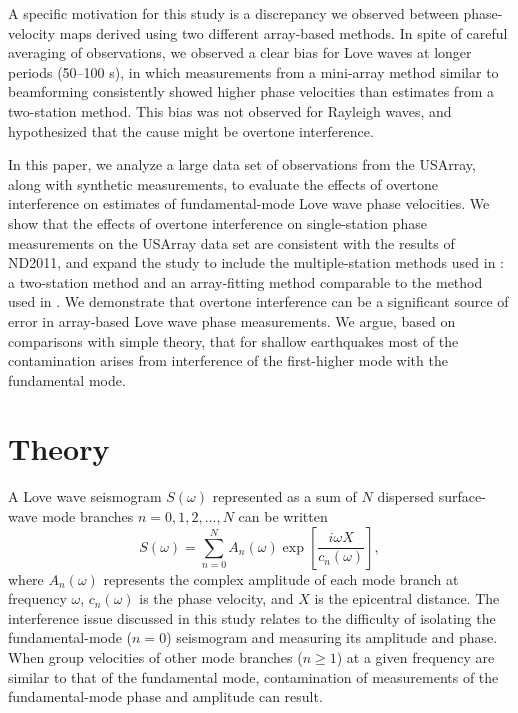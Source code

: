\documentclass[12pt,oneside]{book}
\begin{document}
A specific motivation for this study is a discrepancy we observed \citep{Fosteretal2014} between phase-velocity maps derived using two different array-based methods. In spite of careful averaging of observations, we observed a clear bias for Love waves at longer periods (50--100 s), in which measurements from a mini-array method similar to beamforming consistently showed higher phase velocities than estimates from a two-station method. This bias was not observed for Rayleigh waves, and \citet{Fosteretal2014} hypothesized that the cause might be overtone interference. 

In this paper, we analyze a large data set of observations from the USArray, along with synthetic measurements, to evaluate the effects of overtone interference on estimates of fundamental-mode Love wave phase velocities. We show that the effects of overtone interference on single-station phase measurements on the USArray data set are consistent with the results of ND2011, and expand the study to include the multiple-station methods used in \citet{Fosteretal2014}: a two-station method and an array-fitting method comparable to the method used in \citet{PoletKanamori1997}.  We demonstrate that overtone interference can be a significant source of error in array-based Love wave phase measurements. We argue, based on comparisons with simple theory, that for shallow earthquakes most of the contamination arises from interference of the first-higher mode with the fundamental mode. 

\section{Theory}
A Love wave seismogram $S(\omega)$ represented as a sum of $N$ dispersed surface-wave mode branches $n=0,1,2,...,N$ can be written 
\begin{equation}\label{eqot:1}
S(\omega) = \sum_{n=0}^{N} A_{n}(\omega) \exp \left[ \frac{i \omega X}{c_{n}(\omega)} \right],
\end{equation}
where $A_n(\omega)$ represents the complex amplitude of each mode branch at frequency $\omega$, $c_{n}(\omega)$ is the phase velocity, and $X$ is the epicentral distance. The interference issue discussed in this study relates to the difficulty of isolating the fundamental-mode ($n=0$) seismogram and measuring its amplitude and phase. When group velocities of other mode branches ($n\geq1$) at a given frequency are similar to that of the fundamental mode, contamination of  measurements of the fundamental-mode phase and amplitude can result.
\end{document}

